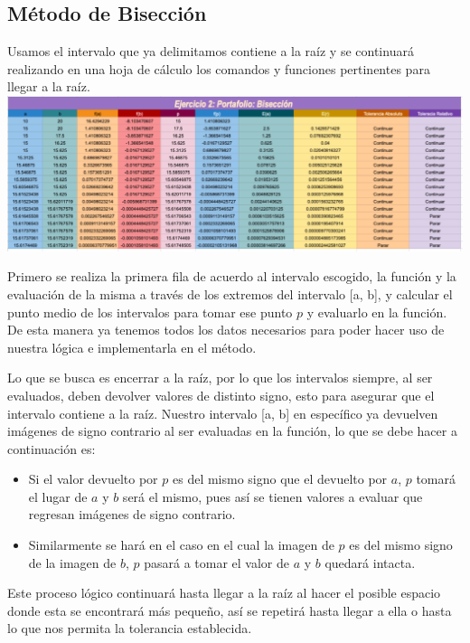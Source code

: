\documentclass{article}
\begin{document}
\subsection{Método de Bisección}
Usamos el intervalo que ya delimitamos contiene a la raíz y se continuará realizando en una hoja de cálculo los comandos y funciones pertinentes para llegar a la raíz.
\\
\includegraphics[scale=0.3]{Biseccion.png}

Primero se realiza la primera fila de acuerdo al intervalo escogido, la función y la evaluación de la misma a través de los extremos del intervalo [a, b], y calcular el punto medio de los intervalos para tomar ese punto \(p\) y evaluarlo en la función. De esta manera ya tenemos todos los datos necesarios para poder hacer uso de nuestra lógica e implementarla en el método.

Lo que se busca es encerrar a la raíz, por lo que los intervalos siempre, al ser evaluados, deben devolver valores de distinto signo, esto para asegurar que el intervalo contiene a la raíz. Nuestro intervalo [a, b] en específico ya devuelven imágenes de signo contrario al ser evaluadas en la función, lo que se debe hacer a continuación es:

\begin{itemize}
    \item Si el valor devuelto por \(p\) es del mismo signo que el devuelto por \(a\), \(p\) tomará el lugar de \(a\) y \(b\) será el mismo, pues así se tienen valores a evaluar que regresan imágenes de signo contrario.
    \item Similarmente se hará en el caso en el cual la imagen de \(p\) es del mismo signo de la imagen de \(b\), \(p\) pasará a tomar el valor de \(a\) y \(b\) quedará intacta.
\end{itemize}

Este proceso lógico continuará hasta llegar a la raíz al hacer el posible espacio donde esta se encontrará más pequeño, así se repetirá hasta llegar a ella o hasta lo que nos permita la tolerancia establecida.
\end{document}
